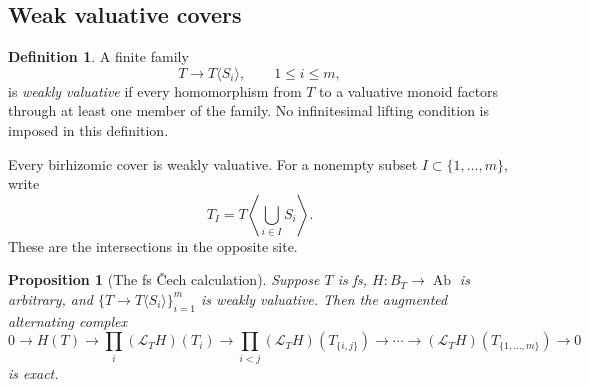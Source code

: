 \documentclass[11pt]{article}
\newtheorem{proposition}[theorem]{Proposition}
\theoremstyle{definition}
\newtheorem{definition}[theorem]{Definition}
\theoremstyle{remark}
\DeclareMathOperator{\Ab}{Ab}
\newcommand{\LL}{\mathcal L}
\begin{document}
\subsection{Weak valuative covers}

\begin{definition}\label{def:weak}
A finite family
\[
T\longrightarrow T\langle S_i\rangle,\qquad 1\le i\le m,
\]
is \emph{weakly valuative} if every homomorphism from \(T\) to a
valuative monoid factors through at least one member of the
family. No infinitesimal lifting condition is imposed in this
definition.
\end{definition}
Every birhizomic cover is weakly valuative. For a nonempty subset
\(I\subset\{1,\ldots,m\}\), write
\[
T_I=T\left\langle\bigcup_{i\in I}S_i\right\rangle.
\]
These are the intersections in the opposite site.

\begin{proposition}[The fs \v{C}ech calculation]\label{prop:fs-cech}
Suppose \(T\) is fs, \(H:B_T\to\Ab\) is arbitrary, and
\(\{T\to T\langle S_i\rangle\}_{i=1}^m\) is weakly valuative.
Then the augmented alternating complex
\begin{equation}\label{eq:cech}
0\longrightarrow H(T)
\longrightarrow \prod_i(\LL_TH)(T_i)
\longrightarrow \prod_{i<j}(\LL_TH)(T_{\{i,j\}})
\longrightarrow\cdots
\longrightarrow(\LL_TH)(T_{\{1,\ldots,m\}})
\longrightarrow0
\end{equation}
is exact.
\end{proposition}
\end{document}
